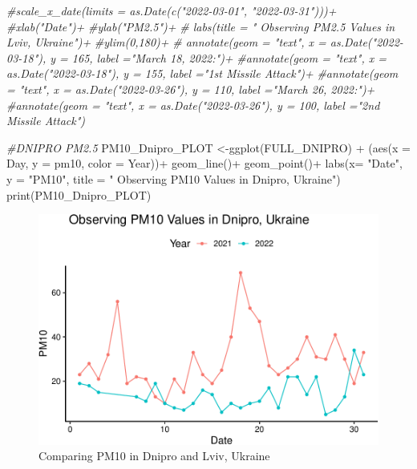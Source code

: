 \documentclass[
  12pt,
]{article}
\newenvironment{Shaded}{\begin{snugshade}}{\end{snugshade}}
\newcommand{\AttributeTok}[1]{\textcolor[rgb]{0.77,0.63,0.00}{#1}}
\newcommand{\CommentTok}[1]{\textcolor[rgb]{0.56,0.35,0.01}{\textit{#1}}}
\newcommand{\FunctionTok}[1]{\textcolor[rgb]{0.00,0.00,0.00}{#1}}
\newcommand{\NormalTok}[1]{#1}
\newcommand{\OtherTok}[1]{\textcolor[rgb]{0.56,0.35,0.01}{#1}}
\newcommand{\SpecialCharTok}[1]{\textcolor[rgb]{0.00,0.00,0.00}{#1}}
\newcommand{\StringTok}[1]{\textcolor[rgb]{0.31,0.60,0.02}{#1}}
\begin{document}
\begin{Shaded}
\begin{Highlighting}[]
  \CommentTok{\#scale\_x\_date(limits = as.Date(c("2022{-}03{-}01", "2022{-}03{-}31")))+ }
  \CommentTok{\#xlab("Date")+ }
  \CommentTok{\#ylab("PM2.5")+ }
 \CommentTok{\# labs(title = "        Observing PM2.5 Values in Lviv, Ukraine")+}
  \CommentTok{\#ylim(0,180)+}
 \CommentTok{\# annotate(geom = "text", x = as.Date("2022{-}03{-}18"), y = 165, label ="March 18, 2022:")+ }
  \CommentTok{\#annotate(geom = "text", x = as.Date("2022{-}03{-}18"), y = 155, label ="1st Missile Attack")+ }
  \CommentTok{\#annotate(geom = "text", x = as.Date("2022{-}03{-}26"), y = 110, label ="March 26, 2022:")+ }
  \CommentTok{\#annotate(geom = "text", x = as.Date("2022{-}03{-}26"), y = 100, label ="2nd Missile Attack")}
\end{Highlighting}
\end{Shaded}

\begin{Shaded}
\begin{Highlighting}[]
\CommentTok{\#DNIPRO PM2.5}
\NormalTok{PM10\_Dnipro\_PLOT }\OtherTok{\textless{}{-}}\FunctionTok{ggplot}\NormalTok{(FULL\_DNIPRO) }\SpecialCharTok{+} 
\NormalTok{  (}\FunctionTok{aes}\NormalTok{(}\AttributeTok{x =}\NormalTok{ Day, }\AttributeTok{y =}\NormalTok{ pm10, }\AttributeTok{color =}\NormalTok{ Year))}\SpecialCharTok{+} 
  \FunctionTok{geom\_line}\NormalTok{()}\SpecialCharTok{+}  
  \FunctionTok{geom\_point}\NormalTok{()}\SpecialCharTok{+}
  \FunctionTok{labs}\NormalTok{(}\AttributeTok{x=} \StringTok{"Date"}\NormalTok{, }\AttributeTok{y =} \StringTok{"PM10"}\NormalTok{,}
       \AttributeTok{title =} \StringTok{" Observing PM10 Values in Dnipro, Ukraine"}\NormalTok{)}
\FunctionTok{print}\NormalTok{(PM10\_Dnipro\_PLOT) }
\end{Highlighting}
\end{Shaded}

\begin{figure}
\centering
\includegraphics{Fontanie_Gordon_Weinberg_Project_files/figure-latex/Plotting PM10-1.pdf}
\caption{Comparing PM10 in Dnipro and Lviv, Ukraine}
\end{figure}
\end{document}
